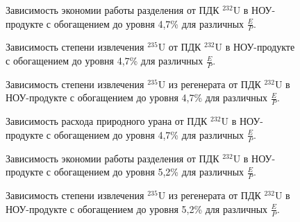 \begin{figure}
    \centering
    \begin{minipage}{.5\textwidth}
      \centering
      
\caption{{Зависимость экономии работы разделения от ПДК $^{232}$U в НОУ-продукте с обогащением до уровня 4,7\% для различных $\frac{E}{P}$.{\label{sw47}}}}
    \end{minipage}%
    \begin{minipage}{.5\textwidth}
      \centering
      
\caption{{Зависимость степени извлечения $^{235}$U от ПДК $^{232}$U в НОУ-продукте с обогащением до уровня 4,7\% для различных $\frac{E}{P}$.{\label{ex47}}}}
\end{minipage}
\end{figure}

\begin{figure}
    \centering
    \begin{minipage}{.5\textwidth}
      \centering
      
\caption{{Зависимость степени извлечения $^{235}$U из регенерата от ПДК $^{232}$U в НОУ-продукте с обогащением до уровня 4,7\% для различных $\frac{E}{P}$.{\label{exR47}}}}
    \end{minipage}%
    \begin{minipage}{.5\textwidth}
      \centering
      
\caption{{Зависимость расхода природного урана от ПДК $^{232}$U в НОУ-продукте с обогащением до уровня 4,7\% для различных $\frac{E}{P}$.{\label{F0R47}}}}
\end{minipage}
\end{figure}






\begin{figure}
    \centering
    \begin{minipage}{.5\textwidth}
      \centering
      
      \caption{{Зависимость экономии работы разделения от ПДК $^{232}$U в НОУ-продукте с обогащением до уровня 5,2\% для различных $\frac{E}{P}$.{\label{sw44}}}}
    \end{minipage}%
    \begin{minipage}{.5\textwidth}
      \centering
      
      \caption{{Зависимость степени извлечения $^{235}$U из регенерата от ПДК $^{232}$U в НОУ-продукте с обогащением до уровня 5,2\% для различных $\frac{E}{P}$.{\label{exR44}}}}
    \end{minipage}
\end{figure}


